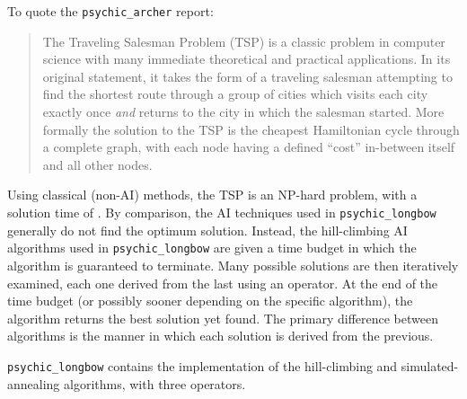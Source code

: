 \documentclass{article}
\begin{document}


To quote the {\tt psychic\_archer} report:

\begin{quote}
The Traveling Salesman Problem (TSP) is a classic problem in computer science with many immediate theoretical and practical applications.
In its original statement, it takes the form of a traveling salesman attempting to find the shortest route through a group of cities which visits each city exactly once {\it and} returns to the city in which the salesman started.
More formally the solution to the TSP is the cheapest Hamiltonian cycle through a complete graph, with each node having a defined ``cost'' in-between itself and all other nodes. \\
\end{quote}

Using classical (non-AI) methods, the TSP is an NP-hard problem, with a solution time of .
By comparison, the AI techniques used in {\tt psychic\_longbow} generally do not find the optimum solution.
Instead, the hill-climbing AI algorithms used in {\tt psychic\_longbow} are given a time budget in which the algorithm is guaranteed to terminate.
Many possible solutions are then iteratively examined, each one derived from the last using an operator.
At the end of the time budget (or possibly sooner depending on the specific algorithm), the algorithm returns the best solution yet found.
The primary difference between algorithms is the manner in which each solution is derived from the previous.

{\tt psychic\_longbow} contains the implementation of the hill-climbing and simulated-annealing algorithms, with three operators.
\end{document}
